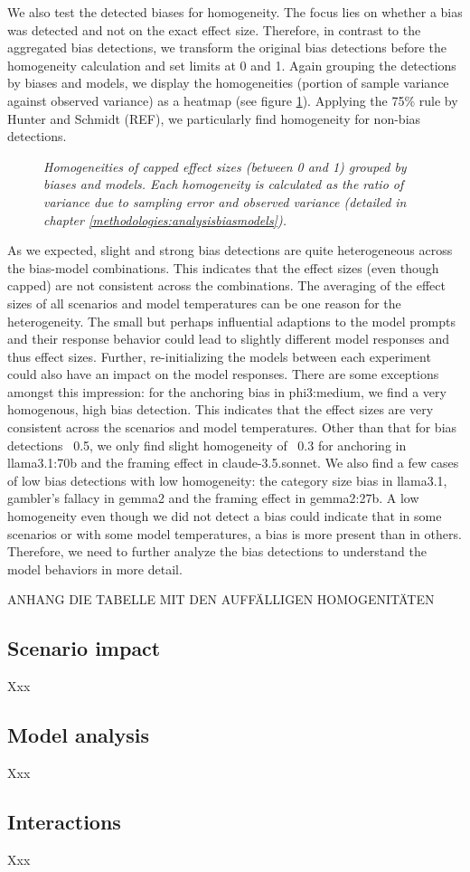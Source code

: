\par We also test the detected biases for homogeneity. The focus lies on whether a bias was detected and not on the exact effect size. Therefore, in contrast to the aggregated bias detections, we transform the original bias detections before the homogeneity calculation and set limits at 0 and 1. Again grouping the detections by biases and models, we display the homogeneities (portion of sample variance against observed variance) as a heatmap (see figure \ref{fig:homogeneity-heatmap}). Applying the 75\% rule by Hunter and Schmidt (REF), we particularly find homogeneity for non-bias detections.

\begin{figure}[htbp]
    \centering
    
    \caption[Heatmap of homogeneities grouped by biases and models]{\centering \textit{Homogeneities of capped effect sizes (between 0 and 1) grouped by biases and models. Each homogeneity is calculated as the ratio of variance due to sampling error and observed variance (detailed in chapter \ref{methodologies:analysisbiasmodels}).}}
    \label{fig:homogeneity-heatmap}
\end{figure}

\par As we expected, slight and strong bias detections are quite heterogeneous across the bias-model combinations. This indicates that the effect sizes (even though capped) are not consistent across the combinations. The averaging of the effect sizes of all scenarios and model temperatures can be one reason for the heterogeneity. The small but perhaps influential adaptions to the model prompts and their response behavior could lead to slightly different model responses and thus effect sizes. Further, re-initializing the models between each experiment could also have an impact on the model responses. There are some exceptions amongst this impression: for the anchoring bias in phi3:medium, we find a very homogenous, high bias detection. This indicates that the effect sizes are very consistent across the scenarios and model temperatures. Other than that for bias detections \geq\, 0.5, we only find slight homogeneity of \geq\, 0.3 for anchoring in llama3.1:70b and the framing effect in claude-3.5.sonnet. We also find a few cases of low bias detections with low homogeneity: the category size bias in llama3.1, gambler's fallacy in gemma2 and the framing effect in gemma2:27b. A low homogeneity even though we did not detect a bias could indicate that in some scenarios or with some model temperatures, a bias is more present than in others. Therefore, we need to further analyze the bias detections to understand the model behaviors in more detail.

ANHANG DIE TABELLE MIT DEN AUFFÄLLIGEN HOMOGENITÄTEN

\subsection{Scenario impact}
Xxx

\subsection{Model analysis}
\label{results:modelanalysis}
Xxx

\subsection{Interactions}
Xxx
